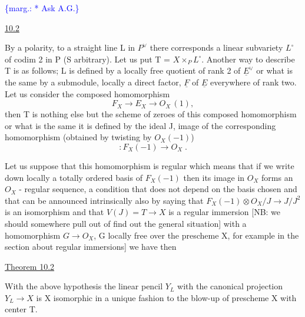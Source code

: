 \documentclass[11pt]{article}
\newcommand{\scanpage}[1]{\par\bigskip\noindent{\small\sffamily[scan #1]}\par}
\newcommand{\mspage}[1]{{\small\sffamily[p.\,#1]}}
\newcommand{\margin}[1]{\textcolor{blue}{\{\textsf{marg.:} #1\}}}
\newcommand{\uline}[1]{\underline{#1}}
\begin{document}
\margin{* Ask A.G.}

\clearpage
\scanpage{24/68}
\mspage{68}

\uline{10.2}

By a polarity, to a straight line L in $P^{\vee}$ there corresponds a
linear subvariety $L^{\circ}$ of codim 2 in P (S arbitrary).  Let us put T =
$X \times_{P} L^{\circ}$.  Another way to describe T is as follows; L is defined by
a locally free quotient of rank 2 of $\underline{E}^{\vee}$ or what is the same by a
submodule, locally a direct factor, $\underline{F}$ of $\underline{E}$ everywhere of rank two.
Let us consider the composed homomorphism
\[ F_{X} \to E_{X} \to O_{X}\,(1), \]
then T is nothing else but the scheme of zeroes of this composed
homomorphism or what is the same it is defined by the ideal J,
image of the corresponding homomorphism (obtained by twisting by
$O_{X}(-1)$)
\[ : F_{X}(-1) \to O_{X} \;. \]

Let us suppose that this homomorphism is regular which means
that if we write down locally a totally ordered basis of $F_{X}(-1)$
then its image in $O_{X}$ forms an $O_{X}$ - regular sequence, a condition
that does not depend on the basis chosen and that can be announced
intrinsically also by saying that $F_{X}(-1) \otimes O_{X}/J \to J/J^{2}$ is an
isomorphism and that $V(J) = T \to X$ is a regular immersion [NB: we
should somewhere pull out of find out the general situation] with
a homomorphism $G \to O_{X}$, G locally free over the prescheme X, for
example in the section about regular immersions] we have then

\clearpage
\scanpage{24/69}
\mspage{69}

\uline{Theorem 10.2}

With the above hypothesis the linear pencil $Y_L$ with the
canonical projection $Y_L \rightarrow X$ is X isomorphic in a unique fashion to
the blow-up of prescheme X with center T.
\end{document}
